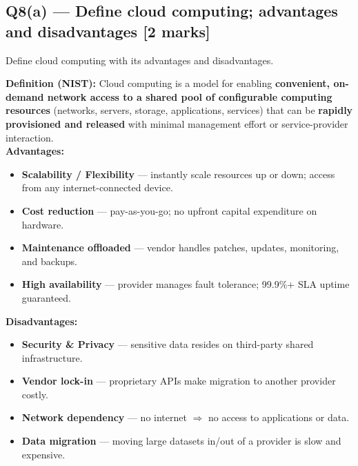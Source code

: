 \documentclass[12pt, a4paper]{article}
\newenvironment{qbox}{\begin{mdframed}[style=qframe]}{\end{mdframed}}
\newenvironment{solbox}{\begin{mdframed}[style=solframe]}{\end{mdframed}}
\newcommand{\qmarks}[1]{\hfill\textbf{\color{orange!70!black}[#1 marks]}}
\begin{document}
\subsection{Q8(a) --- Define cloud computing; advantages and disadvantages
  \texorpdfstring{\qmarks{2}}{}}
\begin{qbox}Define cloud computing with its advantages and disadvantages.\end{qbox}
\begin{solbox}
\textbf{Definition (NIST):} Cloud computing is a model for enabling \textbf{convenient,
on-demand network access to a shared pool of configurable computing resources} (networks,
servers, storage, applications, services) that can be \textbf{rapidly provisioned and released}
with minimal management effort or service-provider interaction.\\[4pt]

\textbf{Advantages:}
\begin{itemize}[leftmargin=1.4cm, itemsep=1pt]
  \item \textbf{Scalability / Flexibility} --- instantly scale resources up or down; access from
    any internet-connected device.
  \item \textbf{Cost reduction} --- pay-as-you-go; no upfront capital expenditure on hardware.
  \item \textbf{Maintenance offloaded} --- vendor handles patches, updates, monitoring, and
    backups.
  \item \textbf{High availability} --- provider manages fault tolerance; 99.9\%+ SLA uptime
    guaranteed.
\end{itemize}

\textbf{Disadvantages:}
\begin{itemize}[leftmargin=1.4cm, itemsep=1pt]
  \item \textbf{Security \& Privacy} --- sensitive data resides on third-party shared
    infrastructure.
  \item \textbf{Vendor lock-in} --- proprietary APIs make migration to another provider
    costly.
  \item \textbf{Network dependency} --- no internet $\Rightarrow$ no access to applications
    or data.
  \item \textbf{Data migration} --- moving large datasets in/out of a provider is slow and
    expensive.
\end{itemize}
\end{solbox}

\end{document}
